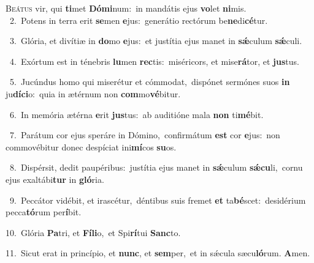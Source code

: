 \lettrine{\initial\textcolor{\initialcolor}{B}}{eátus} vir, qui \textbf{ti}\-met \textbf{Dó}\-\textbf{mi}num:~\star in mandátis ejus \textbf{vo}\-let \textbf{ni}\-mis.\\
{\numbfont\textcolor{\numbcolor}{~2.}}~Potens in terra erit \textbf{se}\-men \textbf{e}\-jus:~\star generátio rectórum be\-\textbf{ne}\-di\-\textbf{cé}\-tur.\par
{\numbfont\textcolor{\numbcolor}{~3.}}~Glória, et divítiæ in \textbf{do}\-mo \textbf{e}\-jus:~\star et justítia ejus manet in \textbf{sǽ}\-culum \textbf{sǽ}\-culi.\par
{\numbfont\textcolor{\numbcolor}{~4.}}~Exórtum est in ténebris \textbf{lu}\-men \textbf{rec}\-tis:~\star miséricors, et mise\-\textbf{rá}\-tor, et \textbf{jus}\-tus.\par
{\numbfont\textcolor{\numbcolor}{~5.}}~Jucúndus homo qui miserétur et cómmodat,~\dagger dispónet sermónes suos \textbf{in} ju\-\textbf{dí}\-\textbf{ci}o:~\star quia in ætérnum non \textbf{com}\-mo\-\textbf{vé}\-bitur.\par
{\numbfont\textcolor{\numbcolor}{~6.}}~In memória ætérna \textbf{e}\-rit \textbf{jus}\-tus:~\star ab auditióne mala \textbf{non} ti\-\textbf{mé}\-bit.\par
{\numbfont\textcolor{\numbcolor}{~7.}}~Parátum cor ejus speráre in Dómino,~\dagger confirmátum \textbf{est} cor \textbf{e}\-jus:~\star non commovébitur donec despíciat ini\-\textbf{mí}\-cos \textbf{su}\-os.\par
{\numbfont\textcolor{\numbcolor}{~8.}}~Dispérsit, dedit paupéribus:~\dagger justítia ejus manet in \textbf{sǽ}\-culum \textbf{sǽ}\-\textbf{cu}li,~\star cornu ejus exaltábi\textbf{tur} in \textbf{gló}\-ria.\par
{\numbfont\textcolor{\numbcolor}{~9.}}~Peccátor vidébit, et irascétur,~\dagger déntibus suis fremet \textbf{et} ta\-\textbf{bé}\-scet:~\star desidérium pecca\-\textbf{tó}\-rum per\-\textbf{í}\-bit.\par
{\numbfont\textcolor{\numbcolor}{10.}}~Glória \textbf{Pa}\-tri, et \textbf{Fí}\-\textbf{li}o,~\star et Spi\-\textbf{rí}\-tui \textbf{Sanc}\-to.\par
{\numbfont\textcolor{\numbcolor}{11.}}~Sicut erat in princípio, et \textbf{nunc}\-, et \textbf{sem}\-per,~\star et in sǽcula sæcu\-\textbf{ló}\-rum. \textbf{A}\-men.\par
